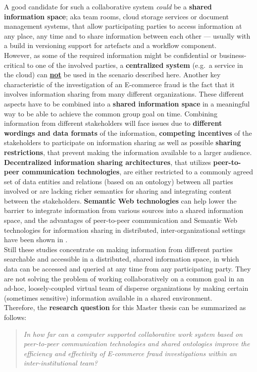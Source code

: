 A good candidate for such a collaborative system \textit{could} be a \textbf{shared information space}; aka team rooms, cloud storage services or document management systems, that allow participating parties to access information at any place, any time and to share information between each other --- usually with a build in versioning support for artefacts and a workflow component. \\

However, as some of the required information might be confidential or business-critical to one of the involved parties, a \textbf{centralized system} (e.g.\ a service in the cloud) can \textbf{\underline{not}} be used in the scenario described here. Another key characteristic of the investigation of an E-commerce fraud is the fact that it involves information sharing from many different organizations. These different aspects have to be combined into a \textbf{shared information space} in a meaningful way to be able to achieve the common group goal on time. Combining information from different stakeholders will face issues due to \textbf{different wordings and data formats} of the information, \textbf{competing incentives} of the stakeholders to participate on information sharing as well as possible \textbf{sharing restrictions}, that prevent making the information available to a larger audience. \\

\textbf{Decentralized information sharing architectures}, that utilizes \textbf{peer-to-peer communication technologies}, are either restricted to a commonly agreed set of data entities and relations (based on an ontology) between all parties involved or are lacking richer semantics for sharing and integrating content between the stakeholders. \textbf{Semantic Web technologies} can help lower the barrier to integrate information from various sources into a shared information space, and the advantages of peer-to-peer communication and Semantic Web technologies for information sharing in distributed, inter-organizational settings have been shown in \citep{Staab2006}. \\

Still these studies concentrate on making information from different parties searchable and accessible in a distributed, shared information space, in which data can be accessed and queried at any time from any participating party. They are not solving the problem of working collaboratively on a common goal in an ad-hoc, loosely-coupled virtual team of disperse organizations by making certain (sometimes sensitive) information available in a shared environment. \\

Therefore, the \textbf{research question} for this Master thesis can be summarized as follows: \@

\begin{quotation}
  \textit{In how far can a computer supported collaborative work system based on peer-to-peer communication technologies and shared ontologies improve the efficiency and effectivity of E-commerce fraud investigations within an inter-institutional team?}
\end{quotation}

